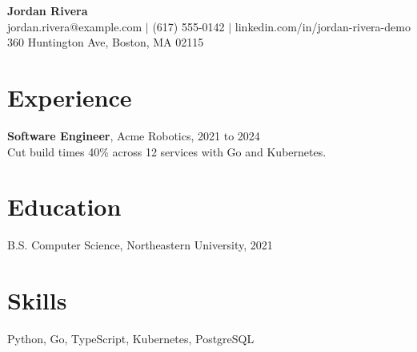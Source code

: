 \documentclass[11pt]{article}
\begin{document}
{\Large\textbf{Jordan Rivera}}\\
jordan.rivera@example.com $|$ (617) 555-0142 $|$ linkedin.com/in/jordan-rivera-demo\\
360 Huntington Ave, Boston, MA 02115

\section*{Experience}
\textbf{Software Engineer}, Acme Robotics, 2021 to 2024\\
Cut build times 40\% across 12 services with Go and Kubernetes.

\section*{Education}
B.S. Computer Science, Northeastern University, 2021

\section*{Skills}
Python, Go, TypeScript, Kubernetes, PostgreSQL
\end{document}
